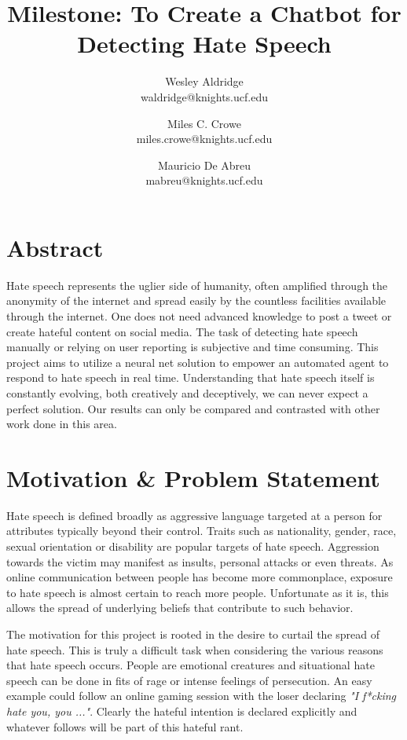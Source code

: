 \documentclass[conference]{sig-alternate-05-2015}
\begin{document}
\title{Milestone: To Create a Chatbot for Detecting Hate Speech}

\author{Wesley Aldridge\\ waldridge@knights.ucf.edu \and Miles C. Crowe  \\ miles.crowe@knights.ucf.edu \and Mauricio De Abreu\\ mabreu@knights.ucf.edu}

\maketitle

\section{Abstract}
Hate speech represents the uglier side of humanity, often amplified through the anonymity of the internet and spread easily by the countless facilities available through the internet.  One does not need advanced knowledge to post a tweet or create hateful content on social media.  The task of detecting hate speech manually or relying on user reporting is subjective and time consuming.  This project aims to utilize a neural net solution to empower an automated agent to respond to hate speech in real time.  Understanding that hate speech itself is constantly evolving, both creatively and deceptively, we can never expect a perfect solution.  Our results can only be compared and contrasted with other work done in this area.

\section{Motivation \& Problem Statement}\label{sec:motivation}
Hate speech is defined broadly as aggressive language targeted at a person for attributes typically beyond their control.  Traits such as nationality, gender, race, sexual orientation or disability are popular targets of hate speech\cite{Dictionary.com}.  Aggression towards the victim may manifest as insults, personal attacks or even threats.  As online communication between people has become more commonplace, exposure to hate speech is almost certain to reach more people.  Unfortunate as it is, this allows the spread of underlying beliefs that contribute to such behavior.

The motivation for this project is rooted in the desire to curtail the spread of hate speech.  This is truly a difficult task when considering the various reasons that hate speech occurs.  People are emotional creatures and situational hate speech can be done in fits of rage or intense feelings of persecution.  An easy example could follow an online gaming session with the loser declaring \textit{"I f*cking hate you, you ..."}.  Clearly the hateful intention is declared explicitly and whatever follows will be part of this hateful rant.  
\end{document}
